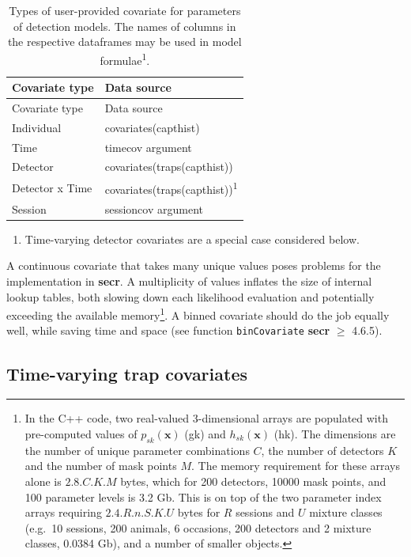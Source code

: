 \documentclass[
]{book}
\providecommand{\tightlist}{%
  \setlength{\itemsep}{0pt}\setlength{\parskip}{0pt}}
\begin{document}
\begin{longtable}[]{@{}ll@{}}
\caption{\label{tab:covariates} Types of user-provided covariate for parameters of detection models. The names
of columns in the respective dataframes may be used in model formulae\textsuperscript{1}.}\tabularnewline
\toprule\noalign{}
Covariate type & Data source \\
\midrule\noalign{}
\endfirsthead
\toprule\noalign{}
Covariate type & Data source \\
\midrule\noalign{}
\endhead
\bottomrule\noalign{}
\endlastfoot
Individual & covariates(capthist) \\
Time & timecov argument \\
Detector & covariates(traps(capthist)) \\
Detector x Time & covariates(traps(capthist))\textsuperscript{1} \\
Session & sessioncov argument \\
\end{longtable}

\begin{enumerate}
\def\labelenumi{\arabic{enumi}.}
\tightlist
\item
  Time-varying detector covariates are a special case considered below.
\end{enumerate}

A continuous covariate that takes many unique values poses problems for the implementation in \textbf{secr}. A multiplicity of values inflates the size of internal lookup tables, both slowing down each likelihood evaluation and potentially exceeding the available memory\footnote{In the C++ code, two real-valued 3-dimensional arrays are populated with pre-computed values of \(p_{sk}(\mathbf{x})\) (gk) and \(h_{sk}(\mathbf{x})\) (hk). The dimensions are the number of unique parameter combinations \(C\), the number of detectors \(K\) and the number of mask points \(M\). The memory requirement for these arrays alone is \(2.8.C.K.M\) bytes, which for 200 detectors, 10000 mask points, and 100 parameter levels is 3.2 Gb. This is on top of the two parameter index arrays requiring \(2 . 4 . R. n. S. K. U\) bytes for \(R\) sessions and \(U\) mixture classes (e.g.~10 sessions, 200 animals, 6 occasions, 200 detectors and 2 mixture classes, 0.0384 Gb), and a number of smaller objects.}. A binned covariate should do the job equally well, while saving time and space (see function \texttt{binCovariate} \textbf{secr} \(\ge\) 4.6.5).

\subsection{Time-varying trap covariates}\label{time-varying-trap-covariates}
\end{document}
